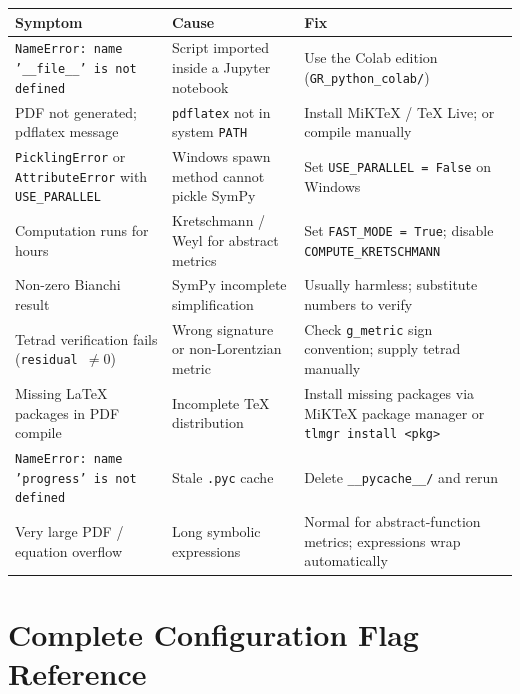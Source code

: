 \documentclass[11pt,a4paper]{article}
\newcommand{\code}[1]{\texttt{\small#1}}
\begin{document}
\begin{center}
\begin{longtable}{p{5cm}p{4cm}p{5.5cm}}
  \toprule
  Symptom & Cause & Fix \\
  \midrule\endhead
  \code{NameError: name '\_\_file\_\_' is not defined}
    & Script imported inside a Jupyter notebook
    & Use the Colab edition (\code{GR\_python\_colab/})  \\[4pt]
  PDF not generated; pdflatex message
    & \code{pdflatex} not in system \code{PATH}
    & Install MiKTeX / TeX Live; or compile manually \\[4pt]
  \code{PicklingError} or \code{AttributeError} with \code{USE\_PARALLEL}
    & Windows spawn method cannot pickle SymPy
    & Set \code{USE\_PARALLEL = False} on Windows \\[4pt]
  Computation runs for hours
    & Kretschmann / Weyl for abstract metrics
    & Set \code{FAST\_MODE = True}; disable \code{COMPUTE\_KRETSCHMANN} \\[4pt]
  Non-zero Bianchi result
    & SymPy incomplete simplification
    & Usually harmless; substitute numbers to verify \\[4pt]
  Tetrad verification fails (\code{residual $\neq 0$})
    & Wrong signature or non-Lorentzian metric
    & Check \code{g\_metric} sign convention; supply tetrad manually \\[4pt]
  Missing LaTeX packages in PDF compile
    & Incomplete TeX distribution
    & Install missing packages via MiKTeX package manager or
      \code{tlmgr install <pkg>} \\[4pt]
  \code{NameError: name 'progress' is not defined}
    & Stale \code{.pyc} cache
    & Delete \code{\_\_pycache\_\_/} and rerun \\[4pt]
  Very large PDF / equation overflow
    & Long symbolic expressions
    & Normal for abstract-function metrics; expressions wrap automatically \\
  \bottomrule
\end{longtable}
\end{center}

\appendix

\section{Complete Configuration Flag Reference}
\label{app:flags}
\end{document}

